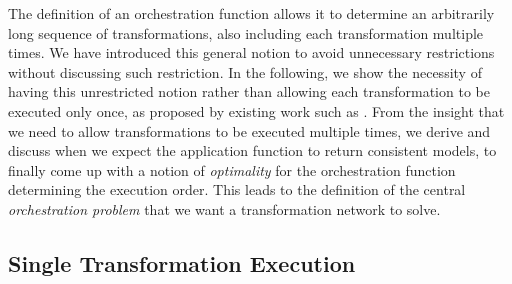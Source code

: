 The definition of an orchestration function allows it to determine an arbitrarily long sequence of transformations, also including each transformation multiple times.
We have introduced this general notion to avoid unnecessary restrictions without discussing such restriction.
In the following, we show the necessity of having this unrestricted notion rather than allowing each transformation to be executed only once, as proposed by existing work such as \cite{stevens2020BidirectionalTransformationLarge-SoSym}.
From the insight that we need to allow transformations to be executed multiple times, we derive and discuss when we expect the application function to return consistent models, to finally come up with a notion of \emph{optimality} for the orchestration function determining the execution order.
This leads to the definition of the central \emph{orchestration problem} that we want a transformation network to solve.




\subsection{Single Transformation Execution}


